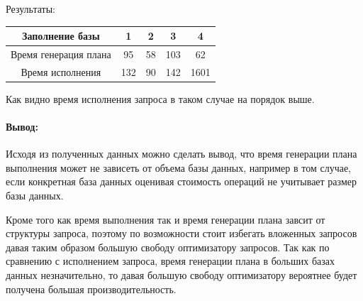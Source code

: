 \documentclass[a4paper,12pt]{article}
\begin{document}
Результаты:
\begin{tabular}[t]{|c|c|c|c|c|}
\hline
Заполнение базы       &   1  &    2 &    3 &     4 \\
\hline
Время генерация плана &  95  &   58 &  103 &    62 \\
\hline
Время исполнения      & 132  &   90 &  142 &  1601 \\
\hline
\end{tabular}

Как видно время исполнения запроса в таком случае на порядок выше.

\paragraph{Вывод:}

Исходя из полученных данных можно сделать вывод, что время генерации плана выполнения может не зависеть
от объема базы данных, например в том случае, если конкретная база данных оценивая стоимость операций не учитывает размер
базы данных.

Кроме того как время выполнения так и время генерации плана завсит от структуры запроса, поэтому по возможности стоит избегать
вложенных запросов давая таким образом большую свободу оптимизатору запросов. Так как по сравнению с исполнением запроса, время
генерации плана в больших базах данных незначительно, то давая большую свободу оптимизатору вероятнее будет получена большая
производительность.
\end{document}
